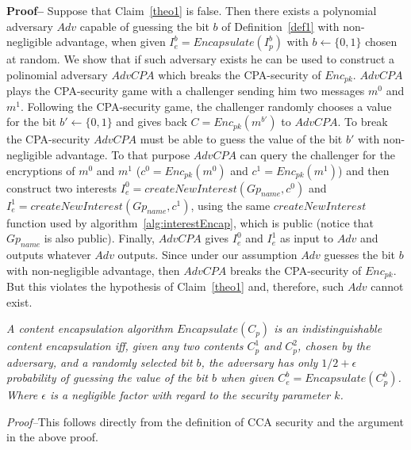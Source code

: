\textbf{Proof--} Suppose that Claim~\ref{theo1} is false. Then there exists a polynomial adversary $Adv$ capable of guessing the bit $b$ of Definition~\ref{def1} with non-negligible advantage, when given $I_e^b = Encapsulate(I_p^b)$ with $b \leftarrow \{0,1\}$ chosen at random. We show that if such adversary exists he can be used to construct a polinomial adversary $AdvCPA$ which breaks the CPA-security of $Enc_{pk}$. $AdvCPA$ plays the CPA-security game with a challenger sending him two messages $m^0$ and $m^1$. Following the CPA-security game, the challenger randomly chooses a value for the bit $b' \leftarrow \{0,1\}$ and gives back $C = Enc_{pk}(m^{b'})$ to $AdvCPA$. To break the CPA-security $AdvCPA$ must be able to guess the value of the bit $b'$ with non-negligible advantage. To that purpose $AdvCPA$ can query the challenger for the encryptions of $m^0$ and $m^1$ ($c^0 = Enc_{pk}(m^0)$ and $c^1 = Enc_{pk}(m^1)$) and then construct two interests $I_e^0 = createNewInterest(Gp_{name}, c^0)$ and $I_e^1 = createNewInterest(Gp_{name}, c^1)$, using the same $createNewInterest$ function used by algorithm~\ref{alg:interestEncap}, which is public (notice that $Gp_{name}$ is also public). Finally, $AdvCPA$ gives $I_e^0$ and $I_e^1$ as input to $Adv$ and outputs whatever $Adv$ outputs. Since under our assumption $Adv$ guesses the bit $b$ with non-negligible advantage, then $AdvCPA$ breaks the CPA-security of $Enc_{pk}$. But this violates the hypothesis of Claim~\ref{theo1} and, therefore, such $Adv$ cannot exist.

\begin{definition}
\textit{
A content encapsulation algorithm $Encapsulate(C_p)$ is an indistinguishable content encapsulation iff, given any two contents $C_p^1$ and $C_p^2$, chosen by the adversary, and a randomly selected bit $b$, the adversary has only $1/2 + \epsilon$ probability of guessing the value of the bit $b$ when given $C_e^b = Encapsulate(C_p^b)$. Where $\epsilon$ is a negligible factor with regard to the security parameter $k$.
}
\end{definition}


\textit{Proof--}This follows directly from the definition of CCA security and the
argument in the above proof.
